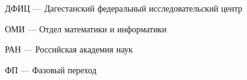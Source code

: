 \item ДФИЦ --- Дагестанский федеральный исследовательский центр
\item ОМИ --- Отдел математики и информатики
\item РАН --- Российская академия наук
\item ФП --- Фазовый переход